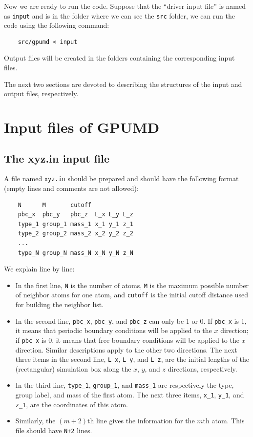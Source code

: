 \documentclass[12pt,a4paper]{report}
\begin{document}
Now we are ready to run the code. Suppose that the ``driver input file'' is named as \verb"input" and is in the folder where we can see the \verb"src" folder, we can run the code using the following command:
\begin{verbatim}
    src/gpumd < input
\end{verbatim}
Output files will be created in the folders containing the corresponding input files.

The next two sections are devoted to describing the structures of the input and output files, respectively.




\section{Input files of GPUMD}


\subsection{The xyz.in input file}

A file named \verb"xyz.in" should be prepared and should have the following format (empty lines and comments are not allowed):
\begin{verbatim}
    N      M       cutoff
    pbc_x  pbc_y   pbc_z  L_x L_y L_z
    type_1 group_1 mass_1 x_1 y_1 z_1
    type_2 group_2 mass_2 x_2 y_2 z_2
    ...
    type_N group_N mass_N x_N y_N z_N
\end{verbatim}
We explain line by line:
\begin{itemize}
\item In the first line, \verb"N" is the number of atoms, \verb"M" is the maximum possible number of neighbor atoms for one atom, and \verb"cutoff" is the initial cutoff distance used for building the neighbor list.
\item In the second line, \verb"pbc_x",  \verb"pbc_y", and \verb"pbc_z" can only be 1 or 0. If \verb"pbc_x" is 1, it means that periodic boundary conditions will be applied to the $x$ direction; if \verb"pbc_x" is 0, it means that free boundary conditions will be applied to the $x$ direction. Similar descriptions apply to the other two directions. The next three items in the second line, \verb"L_x", \verb"L_y", and \verb"L_z", are the initial lengths of the (rectangular) simulation box along the $x$, $y$, and $z$ directions, respectively.
\item In the third line, \verb"type_1", \verb"group_1", and \verb"mass_1" are respectively the type, group label, and mass of the first atom. The next three items, \verb"x_1", \verb"y_1", and \verb"z_1", are the coordinates of this atom.
\item Similarly, the $(m+2)$th line gives the information for the $m$th atom. This file should have \verb"N+2" lines.
\end{itemize}
\end{document}
